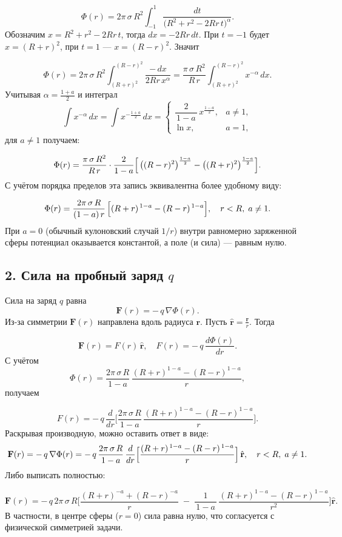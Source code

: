 \documentclass{article}
\begin{document}
\[
\Phi(r)
= 2\pi\,\sigma\,R^2
\int_{-1}^1
\frac{dt}{\bigl(R^2 + r^2 - 2Rr\,t\bigr)^{\alpha}}.
\]
Обозначим $x = R^2 + r^2 - 2Rr\,t$, тогда $dx = -2Rr\,dt$. При $t=-1$ будет $x=(R+r)^2$, при $t=1$ — $x=(R-r)^2$. Значит

\[
\Phi(r)
= 2\pi\,\sigma\,R^2
\int_{(R+r)^2}^{(R-r)^2}
\frac{-\,dx}{2Rr\,x^{\alpha}}
= \frac{\pi\,\sigma\,R^2}{R\,r}
\int_{(R+r)^2}^{(R-r)^2}
x^{-\alpha}\,dx.
\]
Учитывая $\alpha = \tfrac{1+a}{2}$ и интеграл
\[
\int x^{-\alpha}\,dx = \int x^{-\frac{1+a}{2}}\,dx
=
\begin{cases}
\dfrac{2}{\,1-a\,}\,x^{\frac{1-a}{2}}, & a \neq 1,\\
\ln x, & a=1,
\end{cases}
\]
для $a \neq 1$ получаем:

\[
\Phi(r)
= \frac{\pi\,\sigma\,R^2}{R\,r}
\cdot \frac{2}{1-a}
\Bigl[
\,\bigl((R-r)^2\bigr)^{\frac{1-a}{2}}
- \bigl((R+r)^2\bigr)^{\frac{1-a}{2}}
\Bigr].
\]
С учётом порядка пределов эта запись эквивалентна более удобному виду:

\[
\Phi(r)
= \frac{2\pi\,\sigma\,R}{(1-a)\,r}\,\Bigl[
(R+r)^{\,1-a} - (R-r)^{\,1-a}
\Bigr],\quad r<R,\;a\neq 1.
\]
При $a=0$ (обычный кулоновский случай $1/r$) внутри равномерно заряженной сферы потенциал оказывается константой, а поле (и сила) — равным нулю.

\subsection*{2. Сила на пробный заряд $q$}

Сила на заряд $q$ равна
\[
\mathbf{F}(r) = -\,q\,\nabla \Phi(r).
\]
Из-за симметрии $\mathbf{F}(r)$ направлена вдоль радиуса $\mathbf{r}$. Пусть $\hat{\mathbf{r}} = \frac{\mathbf{r}}{r}$. Тогда

\[
\mathbf{F}(r)
= F(r)\,\hat{\mathbf{r}},\quad
F(r)
= -\,q\,\frac{d\Phi(r)}{dr}.
\]
С учётом
\[
\Phi(r)
= \frac{2\pi\,\sigma\,R}{1-a}\,\frac{(R+r)^{1-a} - (R-r)^{1-a}}{r},
\]
получаем

\[
F(r)
= -\,q\,\frac{d}{dr}
\Biggl[
\frac{2\pi\,\sigma\,R}{1-a}\,\frac{(R+r)^{1-a} - (R-r)^{1-a}}{r}
\Biggr].
\]
Раскрывая производную, можно оставить ответ в виде:
\[
\mathbf{F}(r)
= -\,q\,\nabla\Phi(r)
= -\,q\,\frac{2\pi\,\sigma\,R}{1-a}
\,\frac{d}{dr}
\Bigl[
\frac{(R+r)^{\,1-a} - (R-r)^{\,1-a}}{\,r\,}
\Bigr]
\,\hat{\mathbf{r}},\quad r < R,\; a \neq 1.
\]
Либо выписать полностью:

\[
\mathbf{F}(r)
= -\,q\,2\pi\,\sigma\,R
\Biggl[
\frac{(R+r)^{-a} + (R-r)^{-a}}{r}
\;-\;
\frac{1}{\,1-a\,}\,\frac{(R+r)^{1-a} - (R-r)^{1-a}}{r^2}
\Biggr]
\hat{\mathbf{r}}.
\]
В частности, в центре сферы ($r=0$) сила равна нулю, что согласуется с физической симметрией задачи.
\end{document}
